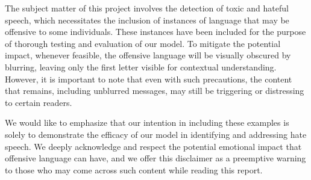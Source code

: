 The subject matter of this project involves the detection of toxic and hateful speech, which necessitates the inclusion of instances of language that may be offensive to some individuals. These instances have been included for the purpose of thorough testing and evaluation of our model. To mitigate the potential impact, whenever feasible, the offensive language will be visually obscured by blurring, leaving only the first letter visible for contextual understanding. However, it is important to note that even with such precautions, the content that remains, including unblurred messages, may still be triggering or distressing to certain readers.

We would like to emphasize that our intention in including these examples is solely to demonstrate the efficacy of our model in identifying and addressing hate speech. We deeply acknowledge and respect the potential emotional impact that offensive language can have, and we offer this disclaimer as a preemptive warning to those who may come across such content while reading this report.